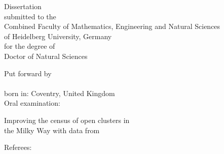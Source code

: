 %




\begin{titlepage}
	\centering
	\begin{large}
		Dissertation\\[2mm]
		submitted to the\\[2mm]
		Combined Faculty of Mathematics, Engineering and Natural Sciences\\[2mm]
		of Heidelberg University, Germany\\[2mm]
		for the degree of\\[2mm]
		Doctor of Natural Sciences\\

		\hfill
		\vfill

		Put forward by\\[2mm]
		\thesisName\\[2mm]
		born in: Coventry, United Kingdom\\[2mm]
		Oral examination: \thesisExamDate\\[2mm]
	\end{large}
\end{titlepage}

\begin{titlepage}
	\centering
	\begin{LARGE}
		Improving the census of open clusters in\\[2mm]
		the Milky Way with data from \gaia\
	\end{LARGE}
	\hfill
	\vfill

	\begin{minipage}[t]{.3\textwidth}
		\raggedleft
		{\large Referees:}
	\end{minipage}
	\hspace*{.1\textwidth}
	\begin{minipage}[t]{.585\textwidth}
		{\large \thesisFirstReviewer} \\[2mm]
		{\large \thesisSecondReviewer} \\
	\end{minipage} \\[5mm]

	\newpage
\end{titlepage}


